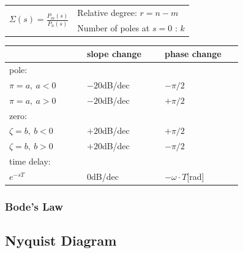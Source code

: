 \documentclass[10pt,a4paper]{scrartcl}
\begin{document}
\begin{multicols*}{3}
\begin{enumerate}
	\end{enumerate}	
	
	\begin{tabular}{ll}
	\multirow{2}{0.45\linewidth}{\Large$\Sigma(s)=\frac{P_m(s)}{P_n(s)}$\normalsize}&Relative degree: $r=n-m$\\
	&Number of poles at $s=0$ : $k$\\
	\end{tabular}
	
	
	
	\begin{tabular}{p{0.29\linewidth}|p{0.29\linewidth}|p{0.29\linewidth}}
	&slope change&phase change\\
	\hline
	pole:&&\\
	\hline
	\hline
	$\pi=a,\ a<0$&$-20$dB/dec&$-\pi/2$\\
	$\pi=a,\ a>0$&$-20$dB/dec&$+\pi/2$\\
	\hline
	zero:&&\\
	\hline
	\hline
	$\zeta=b,\ b<0$&$+20$dB/dec&$+\pi/2$\\
	$\zeta=b,\ b>0$&$+20$dB/dec&$-\pi/2$\\
	\hline
	time delay:&&\\
	\hline
	\hline
	$e^{-sT}$&$0$dB/dec&$-\omega\cdot T $[rad]\\
	\hline
	\end{tabular}	
	
	\subsubsection{Bode's Law}
	
	
	
	
	\subsection{Nyquist Diagram}
	

\end{multicols*}
\end{document}
